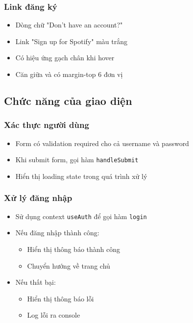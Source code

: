 \documentclass{book}
\begin{document}
\subsubsection{Link đăng ký}
\begin{itemize}
    \item Dòng chữ "Don't have an account?"
    \item Link "Sign up for Spotify" màu trắng
    \item Có hiệu ứng gạch chân khi hover
    \item Căn giữa và có margin-top 6 đơn vị
\end{itemize}

\subsection{Chức năng của giao diện}

\subsubsection{Xác thực người dùng}
\begin{itemize}
    \item Form có validation required cho cả username và password
    \item Khi submit form, gọi hàm \texttt{handleSubmit}
    \item Hiển thị loading state trong quá trình xử lý
\end{itemize}

\subsubsection{Xử lý đăng nhập}
\begin{itemize}
    \item Sử dụng context \texttt{useAuth} để gọi hàm \texttt{login}
    \item Nếu đăng nhập thành công:
    \begin{itemize}
        \item Hiển thị thông báo thành công
        \item Chuyển hướng về trang chủ
    \end{itemize}
    \item Nếu thất bại:
    \begin{itemize}
        \item Hiển thị thông báo lỗi
        \item Log lỗi ra console
    \end{itemize}
\end{itemize}
\end{document}
